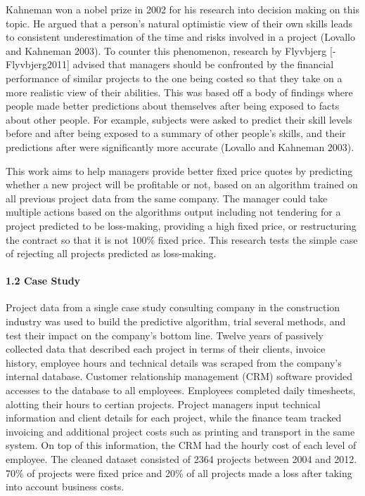 \documentclass[]{elsarticle} %
\begin{document}
Kahneman won a nobel prize in 2002 for his research into decision making
on this topic. He argued that a person's natural optimistic view of
their own skills leads to consistent underestimation of the time and
risks involved in a project (Lovallo and Kahneman 2003). To counter this
phenomenon, research by Flyvbjerg {[}-Flyvbjerg2011{]} advised that
managers should be confronted by the financial performance of similar
projects to the one being costed so that they take on a more realistic
view of their abilities. This was based off a body of findings where
people made better predictions about themselves after being exposed to
facts about other people. For example, subjects were asked to predict
their skill levels before and after being exposed to a summary of other
people's skills, and their predictions after were significantly more
accurate (Lovallo and Kahneman 2003).

This work aims to help managers provide better fixed price quotes by
predicting whether a new project will be profitable or not, based on an
algorithm trained on all previous project data from the same company.
The manager could take multiple actions based on the algorithms output
including not tendering for a project predicted to be loss-making,
providing a high fixed price, or restructuring the contract so that it
is not 100\% fixed price. This research tests the simple case of
rejecting all projects predicted as loss-making.

\paragraph{1.2 Case Study}\label{case-study}

Project data from a single case study consulting company in the
construction industry was used to build the predictive algorithm, trial
several methods, and test their impact on the company's bottom line.
Twelve years of passively collected data that described each project in
terms of their clients, invoice history, employee hours and technical
details was scraped from the company's internal database. Customer
relationship management (CRM) software provided accesses to the database
to all employees. Employees completed daily timesheets, alotting their
hours to certian projects. Project managers input technical information
and client details for each project, while the finance team tracked
invoicing and additional project costs such as printing and transport in
the same system. On top of this information, the CRM had the hourly cost
of each level of employee. The cleaned dataset consisted of 2364
projects between 2004 and 2012. 70\% of projects were fixed price and
20\% of all projects made a loss after taking into account business
costs.
\end{document}
